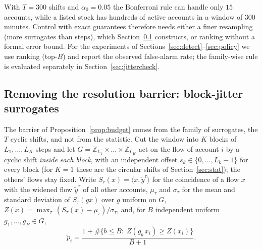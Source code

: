 With $T=300$ shifts and $\alpha_0=0.05$ the Bonferroni rule can handle only $15$ accounts, while a listed stock has hundreds of active accounts in a window of 300 minutes. Control with exact guarantees therefore needs either a finer resampling (more surrogates than steps), which Section~\ref{sec:jitter} constructs, or ranking without a formal error bound. For the experiments of Sections~\ref{sec:detect}--\ref{sec:policy} we use ranking (top-$B$) and report the observed false-alarm rate; the family-wise rule is evaluated separately in Section~\ref{sec:jittercheck}.

\subsection{Removing the resolution barrier: block-jitter surrogates}\label{sec:jitter}

The barrier of Proposition~\ref{prop:budget} comes from the family of surrogates, the $T$ cyclic shifts, and not from the statistic. Cut the window into $K$ blocks of $L_1,\dots,L_K$ steps and let $G=\mathbb Z_{L_1}\times\dots\times\mathbb Z_{L_K}$ act on the flow of account $i$ by a cyclic shift \emph{inside each block}, with an independent offset $s_k\in\{0,\dots,L_k-1\}$ for every block (for $K=1$ these are the circular shifts of Section~\ref{sec:stat}); the others' flows stay fixed. Write $S_\tau(x)=\langle x,\tilde y^{\tau}\rangle$ for the coincidence of a flow $x$ with the widened flow $\tilde y^{\tau}$ of all other accounts, $\mu_\tau$ and $\sigma_\tau$ for the mean and standard deviation of $S_\tau(gx)$ over $g$ uniform on $G$, $Z(x)=\max_\tau\,(S_\tau(x)-\mu_\tau)/\sigma_\tau$, and, for $B$ independent uniform $g_1,\dots,g_B\in G$,
\begin{equation}
\tilde p_i=\frac{1+\#\{b\le B:\;Z(g_b\,x_i)\ge Z(x_i)\}}{B+1}.
\label{eq:pjit}
\end{equation}

